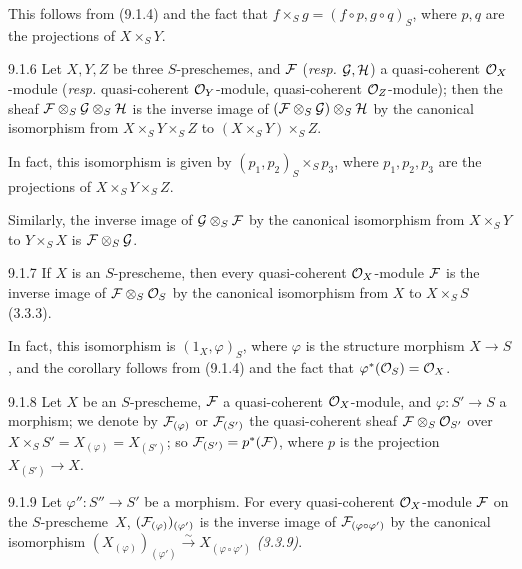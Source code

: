 \documentclass[../main.tex]{subfiles}
\begin{document}
This follows from (9.1.4) and the fact that $f\times_S g=(f\circ p, g\circ q)_S$, where $p,q$ are the projections of $X\times_S Y$.

\begin{env}[Corollary]{9.1.6}
    Let $X,Y,Z$ be three $S$-preschemes, and $\mathcal{F}$ (\emph{resp.} $\mathcal{G},\mathcal{H}$) a quasi-coherent $\mathcal{O}_X$-module (\emph{resp.} quasi-coherent $\mathcal{O}_Y$-module, quasi-coherent $\mathcal{O}_Z$-module); then the sheaf $\mathcal{F}\otimes_S\mathcal{G}\otimes_S\mathcal{H}$ is the inverse image of $(\mathcal{F}\otimes_S\mathcal{G})\otimes_S\mathcal{H}$ by the canonical isomorphism from $X\times_S Y\times_S Z$ to $(X\times_S Y)\times_S Z$.
\end{env}

In fact, this isomorphism is given by $(p_1,p_2)_S\times_S p_3$, where $p_1,p_2,p_3$ are the projections of $X\times_S Y\times_S Z$.

Similarly, the inverse image of $\mathcal{G}\otimes_S\mathcal{F}$ by the canonical isomorphism from $X\times_S Y$ to $Y\times_S X$ is $\mathcal{F}\otimes_S\mathcal{G}$.

\begin{env}[Corollary]{9.1.7}
    If $X$ is an $S$-prescheme, then every quasi-coherent $\mathcal{O}_X$-module $\mathcal{F}$ is the inverse image of $\mathcal{F}\otimes_S\mathcal{O}_S$ by the canonical isomorphism from $X$ to $X\times_S S$ (3.3.3).
\end{env}

In fact, this isomorphism is $(1_X,\varphi)_S$, where $\varphi$ is the structure morphism $X\to S$, and the corollary follows from (9.1.4) and the fact that $\varphi^*(\mathcal{O}_S)=\mathcal{O}_X$.

\begin{env}{9.1.8}
    Let $X$ be an $S$-prescheme, $\mathcal{F}$ a quasi-coherent $\mathcal{O}_X$-module, and $\varphi\colon S'\to S$ a morphism; we denote by $\mathcal{F}_{(\varphi)}$ or $\mathcal{F}_{(S')}$ the quasi-coherent sheaf $\mathcal{F}\otimes_S\mathcal{O}_{S'}$ over $X\times_S S'=X_{(\varphi)}=X_{(S')}$; so $\mathcal{F}_{(S')}=p^*(\mathcal{F})$, where $p$ is the projection $X_{(S')}\to X$.
\end{env}

\begin{env}[Proposition]{9.1.9}
    Let $\varphi''\colon S''\to S'$ be a morphism.
    For every quasi-coherent $\mathcal{O}_X$-module $\mathcal{F}$ on the $S$-prescheme~$X$, $(\mathcal{F}_{(\varphi)})_{(\varphi')}$ is the inverse image of $\mathcal{F}_{(\varphi\circ\varphi')}$ by the canonical isomorphism $(X_{(\varphi)})_{(\varphi')}\xrightarrow{\sim}X_{(\varphi\circ\varphi')}$ \emph{(3.3.9)}.
\end{env}
\end{document}

